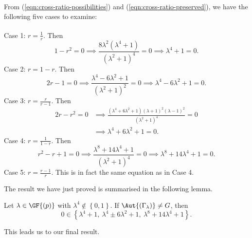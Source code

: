 From (\ref{eqn:cross-ratio-possibilities}) and (\ref{eqn:cross-ratio-preserved}), we have the following five cases to examine: \\\\
Case 1: $r = \frac{1}{r}$. Then
\begin{displaymath}
1 - r^2 = 0 \implies \frac{8 \lambda^2 \left(\lambda^4 + 1 \right)}{\left(\lambda^2 + 1 \right)^4} = 0 \implies \lambda^4 + 1 = 0.
\end{displaymath}
Case 2: $r = 1-r$. Then
\begin{displaymath}
2r - 1 = 0 \implies \frac{\lambda^4 - 6 \lambda^2 + 1}{\left(\lambda^2 + 1 \right)^2} = 0 \implies \lambda^4 - 6 \lambda^2 + 1 = 0.
\end{displaymath}
Case 3: $r = \frac{r}{r-1}$. Then
\begin{align*}
2r - r^2 = 0 &\implies \frac{\left(\lambda^4 + 6 \lambda^2 + 1 \right) \left(\lambda + 1 \right)^2 \left(\lambda - 1 \right)^2}{\left(\lambda^2 + 1 \right)^4} = 0 \\ &\implies \lambda^4 + 6 \lambda^2 + 1 = 0.
\end{align*}
Case 4: $r = \frac{1}{1-r}$. Then
\begin{displaymath}
r^2 - r + 1 = 0 \implies \frac{\lambda^8 + 14 \lambda^4 + 1}{\left(\lambda^2 + 1 \right)^4} = 0 \implies \lambda^8 + 14 \lambda^4 + 1 = 0.
\end{displaymath}
Case 5: $r = \frac{r-1}{r}$. This is in fact the same equation as in Case 4.

The result we have just proved is summarised in the following lemma.
\begin{lemma} \label{lm:Lambda_lambda}
Let $\lambda \in \GF{\left(p \right)}$ with $\lambda^4 \notin \left\{0, 1 \right\}$. If $\Aut{\left(\Gamma_\lambda \right)} \neq G$, then
\begin{displaymath}
0 \in {\left\{\lambda^4 + 1,\ \lambda^4 \pm 6 \lambda^2 + 1,\ \lambda^8 + 14 \lambda^4 + 1 \right\}}.
\end{displaymath}
\end{lemma}

This leads us to our final result.

